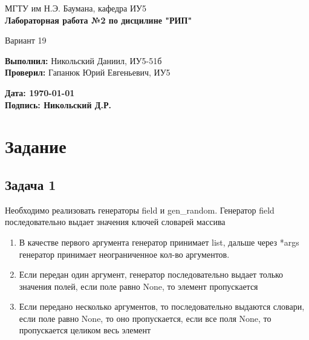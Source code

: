 \documentclass{article}
\begin{document}
\begin{titlepage}
    \begin{center}
        \normalsize
        МГТУ им Н.Э. Баумана, кафедра ИУ5 \\
        \vspace*{1cm}
        \LARGE
        \textbf{Лабораторная работа №2 по дисцилине "РИП"}

        \vspace{0.5cm}
        Вариант 19
    \end{center}
    \vfill

    \begin{flushright}
        \textbf{Выполнил:} Никольский Даниил, ИУ5-51б \\
        \textbf{Проверил: } Гапанюк Юрий Евгеньевич, ИУ5 \\
    \end{flushright}
    \vspace{1.5cm}
    \begin{flushleft}
        \textbf{Дата: \today} \\
        \textbf{Подпись: Никольский Д.Р.} \\
    \end{flushleft}
\end{titlepage}

\tableofcontents
\newpage

\section{Задание}
\subsection{Задача 1}
Необходимо реализовать генераторы field и gen\_random. Генератор field последовательно выдает значения ключей словарей массива

\begin{enumerate}
    \item В качестве первого аргумента генератор принимает list, дальше через *args генератор принимает неограниченное кол-во аргументов.

    \item Если передан один аргумент, генератор последовательно выдает только значения полей, если поле равно None, то элемент пропускается

    \item Если передано несколько аргументов, то последовательно выдаются словари, если поле равно None, то оно пропускается, если все поля None, то пропускается целиком весь элемент

\end{enumerate}
\end{document}
